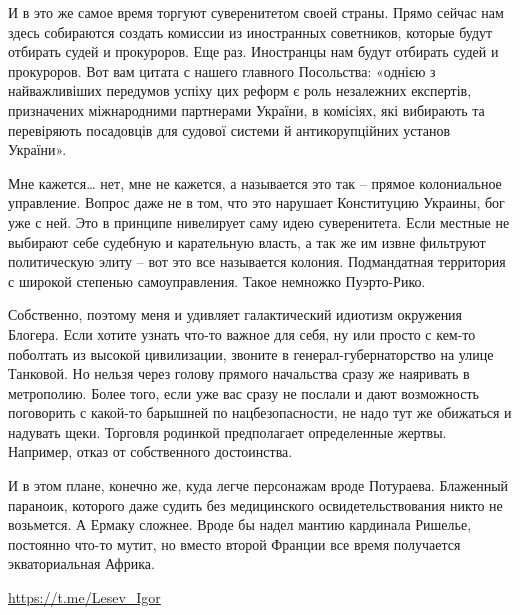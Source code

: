 И в это же самое время торгуют суверенитетом своей страны. Прямо сейчас нам
здесь собираются создать комиссии из иностранных советников, которые будут
отбирать судей и прокуроров. Еще раз. Иностранцы нам будут отбирать судей и
прокуроров. Вот вам цитата с нашего главного Посольства: «однією з
найважливіших передумов успіху цих реформ є роль незалежних експертів,
призначених міжнародними партнерами України, в комісіях, які вибирають та
перевіряють посадовців для судової системи й антикорупційних установ України».

Мне кажется… нет, мне не кажется, а называется это так – прямое колониальное
управление. Вопрос даже не в том, что это нарушает Конституцию Украины, бог уже
с ней. Это в принципе нивелирует саму идею суверенитета. Если местные не
выбирают себе судебную и карательную власть, а так же им извне фильтруют
политическую элиту – вот это все называется колония. Подмандатная территория с
широкой степенью самоуправления. Такое немножко Пуэрто-Рико.

Собственно, поэтому меня и удивляет галактический идиотизм окружения Блогера.
Если хотите узнать что-то важное для себя, ну или просто с кем-то поболтать из
высокой цивилизации, звоните в генерал-губернаторство на улице Танковой. Но
нельзя через голову прямого начальства сразу же наяривать в метрополию. Более
того, если уже вас сразу не послали и дают возможность поговорить с какой-то
барышней по нацбезопасности, не надо тут же обижаться и надувать щеки. Торговля
родинкой предполагает определенные жертвы. Например, отказ от собственного
достоинства.

И в этом плане, конечно же, куда легче персонажам вроде Потураева. Блаженный
параноик, которого даже судить без медицинского освидетельствования никто не
возьмется. А Ермаку сложнее. Вроде бы надел мантию кардинала Ришелье, постоянно
что-то мутит, но вместо второй Франции все время получается экваториальная
Африка.

\url{https://t.me/Lesev_Igor}





